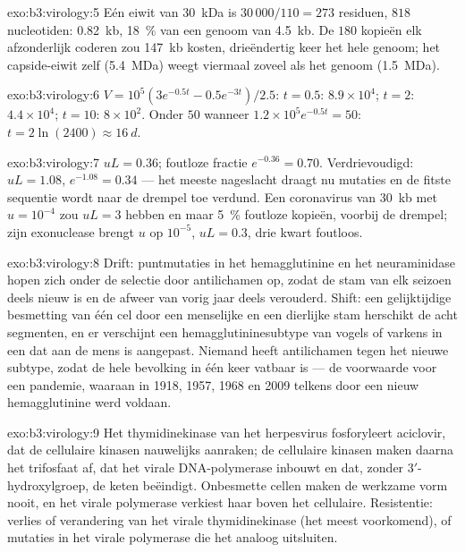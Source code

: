 \begin{solution}{exo:b3:virology:5}
Eén eiwit van \qty{30}{kDa} is $30\,000/110 = 273$ residuen, $818$
nucleotiden: \qty{0.82}{kb}, \qty{18}{\%} van een genoom van
\qty{4.5}{kb}. De $180$ kopieën elk afzonderlijk coderen zou
\qty{147}{kb} kosten, drieëndertig keer het hele genoom; het
capside-eiwit zelf (\qty{5.4}{MDa}) weegt viermaal zoveel als het
genoom (\qty{1.5}{MDa}).
\end{solution}

\begin{solution}{exo:b3:virology:6}
$V = 10^{5}(3e^{-0.5t} - 0.5e^{-3t})/2.5$: $t = 0.5$: $8.9\times
10^{4}$; $t = 2$: $4.4\times 10^{4}$; $t = 10$: $8\times 10^{2}$. Onder
$50$ wanneer $1.2\times 10^{5}e^{-0.5t} = 50$: $t = 2\ln(2400) \approx
\qty{16}{d}$.
\end{solution}

\begin{solution}{exo:b3:virology:7}
$uL = 0.36$; foutloze fractie $e^{-0.36} = 0.70$. Verdrievoudigd: $uL =
1.08$, $e^{-1.08} = 0.34$ --- het meeste nageslacht draagt nu
mutaties en de fitste sequentie wordt naar de drempel toe verdund. Een
coronavirus van \qty{30}{kb} met $u = 10^{-4}$ zou $uL = 3$ hebben en
maar \qty{5}{\%} foutloze kopieën, voorbij de drempel; zijn exonuclease
brengt $u$ op $10^{-5}$, $uL = 0.3$, drie kwart foutloos.
\end{solution}

\begin{solution}{exo:b3:virology:8}
Drift: puntmutaties in het hemagglutinine en het neuraminidase hopen
zich onder de selectie door antilichamen op, zodat de stam van elk
seizoen deels nieuw is en de afweer van vorig jaar deels verouderd.
Shift: een gelijktijdige besmetting van één cel door een menselijke en
een dierlijke stam herschikt de acht segmenten, en er verschijnt een
hemagglutininesubtype van vogels of varkens in een  dat aan de
mens is aangepast. Niemand heeft antilichamen tegen het nieuwe subtype,
zodat de hele bevolking in één keer vatbaar is --- de voorwaarde voor
een pandemie, waaraan in 1918, 1957, 1968 en 2009 telkens door een
nieuw hemagglutinine werd voldaan.
\end{solution}

\begin{solution}{exo:b3:virology:9}
Het thymidinekinase van het herpesvirus fosforyleert aciclovir, dat de
cellulaire kinasen nauwelijks aanraken; de cellulaire kinasen maken
daarna het trifosfaat af, dat het virale DNA-polymerase inbouwt en
dat, zonder 3$'$-hydroxylgroep, de keten beëindigt. Onbesmette cellen
maken de werkzame vorm nooit, en het virale polymerase verkiest haar
boven het cellulaire. Resistentie: verlies of verandering van het virale
thymidinekinase (het meest voorkomend), of mutaties in het virale
polymerase die het analoog uitsluiten.
\end{solution}

